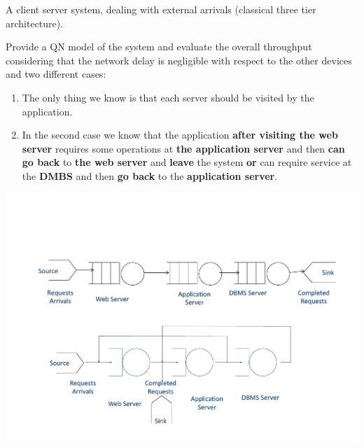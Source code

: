 \begin{examplebox}
	A client server system, dealing with external arrivals (classical three tier architecture).
	
	Provide a QN model of the system and evaluate the overall throughput considering that the network delay is negligible with respect to the other devices and two different cases:
	\begin{enumerate}
		\item The only thing we know is that each server should be visited by the application.
		\item In the second case we know that the application \textbf{after visiting the web server} requires some operations at \textbf{the application server} and then \textbf{can go back} to \textbf{the web server} and \textbf{leave} the system \textbf{or} can require service at the \textbf{DMBS} and then \textbf{go back} to the \textbf{application server}.
	\end{enumerate}
	\begin{center}
		\includegraphics[width=\textwidth]{img/queueing-network-9.pdf}
	\end{center}
\end{examplebox}

